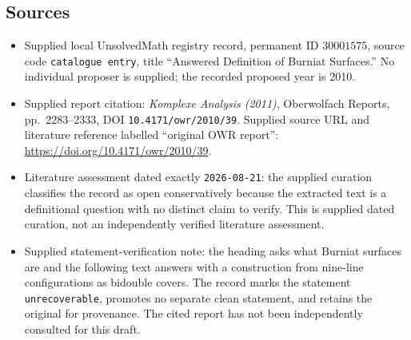 \documentclass[11pt]{article}
\begin{document}
\subsection{Sources}
\begin{itemize}
\item Supplied local UnsolvedMath registry record, permanent ID \(30001575\), source code \texttt{catalogue entry}, title ``Answered Definition of Burniat Surfaces.'' No individual proposer is supplied; the recorded proposed year is 2010.
\item Supplied report citation: \emph{Komplexe Analysis (2011)}, Oberwolfach Reports, pp.~2283--2333, DOI \texttt{10.4171/owr/2010/39}. Supplied source URL and literature reference labelled ``original OWR report'': \url{https://doi.org/10.4171/owr/2010/39}.
\item Literature assessment dated exactly \texttt{2026-08-21}: the supplied curation classifies the record as open conservatively because the extracted text is a definitional question with no distinct claim to verify. This is supplied dated curation, not an independently verified literature assessment.
\item Supplied statement-verification note: the heading asks what Burniat surfaces are and the following text answers with a construction from nine-line configurations as bidouble covers. The record marks the statement \texttt{unrecoverable}, promotes no separate clean statement, and retains the original for provenance. The cited report has not been independently consulted for this draft.
\end{itemize}
\end{document}

